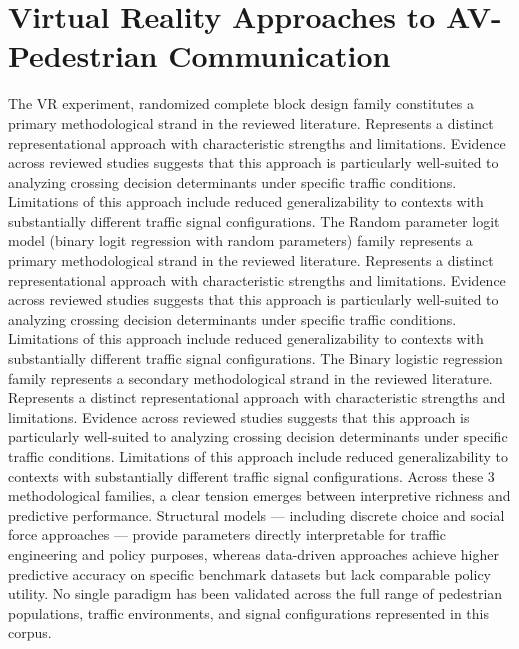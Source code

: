 \documentclass{article}
\begin{document}
\section{Virtual Reality Approaches to AV-Pedestrian Communication}
The VR experiment, randomized complete block design family constitutes a primary methodological strand in the reviewed literature. Represents a distinct representational approach with characteristic strengths and limitations. Evidence across reviewed studies suggests that this approach is particularly well-suited to analyzing crossing decision determinants under specific traffic conditions. Limitations of this approach include reduced generalizability to contexts with substantially different traffic signal configurations. The Random parameter logit model (binary logit regression with random parameters) family represents a primary methodological strand in the reviewed literature. Represents a distinct representational approach with characteristic strengths and limitations. Evidence across reviewed studies suggests that this approach is particularly well-suited to analyzing crossing decision determinants under specific traffic conditions. Limitations of this approach include reduced generalizability to contexts with substantially different traffic signal configurations. The Binary logistic regression family represents a secondary methodological strand in the reviewed literature. Represents a distinct representational approach with characteristic strengths and limitations. Evidence across reviewed studies suggests that this approach is particularly well-suited to analyzing crossing decision determinants under specific traffic conditions. Limitations of this approach include reduced generalizability to contexts with substantially different traffic signal configurations. Across these 3 methodological families, a clear tension emerges between interpretive richness and predictive performance. Structural models — including discrete choice and social force approaches — provide parameters directly interpretable for traffic engineering and policy purposes, whereas data-driven approaches achieve higher predictive accuracy on specific benchmark datasets but lack comparable policy utility. No single paradigm has been validated across the full range of pedestrian populations, traffic environments, and signal configurations represented in this corpus.
\end{document}
